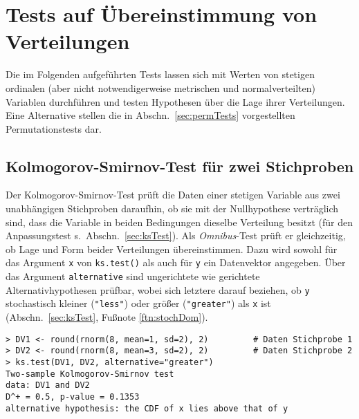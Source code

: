 \section{Tests auf Übereinstimmung von Verteilungen}
\label{sec:distrEq}

Die im Folgenden aufgeführten Tests lassen sich mit Werten von stetigen ordinalen (aber nicht notwendigerweise metrischen und normalverteilten) Variablen durchführen und testen Hypothesen über die Lage ihrer Verteilungen. Eine Alternative stellen die in Abschn.\ \ref{sec:permTests} vorgestellten Permutationstests dar.

\subsection{Kolmogorov-Smirnov-Test für zwei Stichproben}
\label{sec:ksoTest}

Der Kolmogorov-Smirnov-Test prüft die Daten einer stetigen Variable aus zwei unabhängigen Stichproben daraufhin, ob sie mit der Nullhypothese verträglich sind, dass die Variable in beiden Bedingungen dieselbe Verteilung besitzt (für den Anpassungstest s.\ Abschn.\ \ref{sec:ksTest}). Als \emph{Omnibus}-Test prüft er gleichzeitig, ob Lage und Form beider Verteilungen übereinstimmen. Dazu wird sowohl für das Argument \lstinline!x! von \lstinline!ks.test()! als auch für \lstinline!y! ein Datenvektor angegeben. Über das Argument \lstinline!alternative! sind ungerichtete wie gerichtete Alternativhypothesen prüfbar, wobei sich letztere darauf beziehen, ob \lstinline!y! stochastisch kleiner (\lstinline!"less"!) oder größer (\lstinline!"greater"!) als \lstinline!x! ist (Abschn.\ \ref{sec:ksTest}, Fußnote \ref{ftn:stochDom}).
\begin{lstlisting}
> DV1 <- round(rnorm(8, mean=1, sd=2), 2)         # Daten Stichprobe 1
> DV2 <- round(rnorm(8, mean=3, sd=2), 2)         # Daten Stichprobe 2
> ks.test(DV1, DV2, alternative="greater")
Two-sample Kolmogorov-Smirnov test
data: DV1 and DV2
D^+ = 0.5, p-value = 0.1353
alternative hypothesis: the CDF of x lies above that of y
\end{lstlisting}

